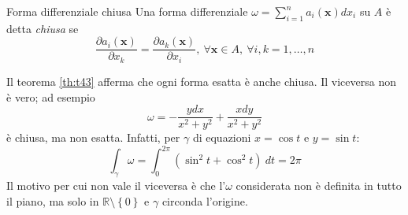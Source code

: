 \documentclass[11pt, a4paper]{scrartcl}
\theoremstyle{definition}
\numberwithin{esempio}{section}
\theoremstyle{definition}
\numberwithin{obs}{section}
\numberwithin{nota}{section}
\numberwithin{equation}{subsection}
\begin{document}
\begin{definizione}
	{Forma differenziale chiusa}{}
	Una forma differenziale $\omega = \sum_{i=1}^{n} a_i(\mathbf{x} ) dx_i$ su $A$ \`e detta \textit{chiusa} se
	\begin{equation}
		\frac{\partial a_i(\mathbf{x} )}{\partial x_k}  = \frac{\partial a_k(\mathbf{x} )}{\partial x_i} , \ \forall \mathbf{x} \in A, \ \forall i,k = 1 ,\ldots,n
	\end{equation}
\end{definizione}
Il teorema \ref{th:t43} afferma che ogni forma esatta \`e anche chiusa.
Il viceversa non \`e vero; ad esempio
\[
\omega =- \frac{ydx}{x^2 + y^2} + \frac{xdy}{x^2 + y^2}
\] 
\`e chiusa, ma non esatta. 
Infatti, per $\gamma$ di equazioni $x = \cos t$ e $y = \sin t$:
\[
\int_{\gamma} \omega = \int_{0} ^{2\pi} (\sin^2 t + \cos^2 t) \ dt = 2\pi
\] 
Il motivo per cui non vale il viceversa \`e che l'$\omega$ considerata non \`e definita in tutto il piano, ma solo in $\mathbb{R}\setminus\left\{ 0 \right\} $ e $\gamma$ circonda l'origine.
\end{document}
